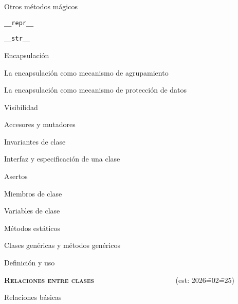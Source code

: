 \begin{longenum}
\begin{longenum}
\begin{longenum}
            \item Otros métodos mágicos
            \begin{longenum}
                \item \texttt{\_\_repr\_\_}
                \item \texttt{\_\_str\_\_}
            \end{longenum}
        \end{longenum}
        \item Encapsulación
        \begin{longenum}
            \item La encapsulación como mecanismo de agrupamiento
            \item La encapsulación como mecanismo de protección de datos
            \begin{longenum}
                \item Visibilidad
                \item Accesores y mutadores
                \item Invariantes de clase
                \item Interfaz y especificación de una clase
                \item Asertos
            \end{longenum}
        \end{longenum}
        \item Miembros de clase
        \begin{longenum}
            \item Variables de clase
            \item Métodos estáticos
        \end{longenum}
        \item Clases genéricas y métodos genéricos
        \begin{longenum}
            \item Definición y uso
        \end{longenum}
    \end{longenum}
    \item \textbf{\textsc{Relaciones entre clases}} \ \ \ \ \ \ \ \ \ \ \ \ \ \ \ \ \ \ \ \ \ \ (est: 2026\==02\==25)
    \begin{longenum}
        \item Relaciones básicas
        \begin{longenum}

\end{longenum}
\end{longenum}
\end{longenum}
